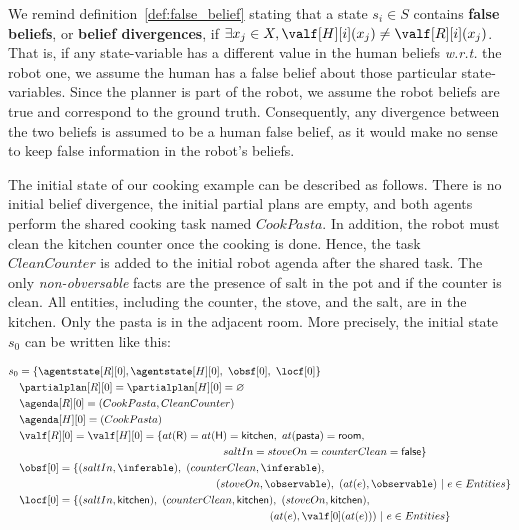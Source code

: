 We remind definition~\ref{def:false_belief} stating that a state $s_i \in S$ contains \textbf{false beliefs}, or \textbf{belief divergences}, if $\exists x_j \in X, \valf[H][i](x_j) \neq \valf[R][i](x_j)$. That is, if any state-variable has a different value in the human beliefs \textit{w.r.t.} the robot one, we assume the human has a false belief about those particular state-variables. Since the planner is part of the robot, we assume the robot beliefs are true and correspond to the ground truth. Consequently, any divergence between the two beliefs is assumed to be a human false belief, as it would make no sense to keep false information in the robot's beliefs. 

The initial state of our cooking example can be described as follows. There is no initial belief divergence, the initial partial plans are empty, and both agents perform the shared cooking task named $CookPasta$. In addition, the robot must clean the kitchen counter once the cooking is done. Hence, the task $CleanCounter$ is added to the initial robot agenda after the shared task. The only \textit{non-obversable} facts are the presence of salt in the pot and if the counter is clean. All entities, including the counter, the stove, and the salt, are in the kitchen. Only the pasta is in the adjacent room. More precisely, the initial state $s_0$ can be written like this: 


{\small
\noindent
\begin{align*}
&s_0 = \{\agentstate[R][0], \agentstate[H][0],~\obsf[0],~\locf[0]\} \\
&\quad \partialplan[R][0] = \partialplan[H][0] = \varnothing \\
&\quad \agenda[R][0] = (CookPasta, CleanCounter)\\
&\quad \agenda[H][0] = (CookPasta)\\
&\quad \valf[R][0] = \valf[H][0] = \{at(\textsf{R}) = at(\textsf{H}) = \textsf{kitchen},~at(\textsf{pasta})=\textsf{room},\\
&\qquad \qquad \qquad \qquad \qquad \qquad \qquad \qquad \qquad \quad \quad saltIn = stoveOn =counterClean = \textsf{false}\}\\
&\quad \obsf[0] = \{ (saltIn,\inferable),~(counterClean,\inferable),\\
&\qquad \qquad \qquad \qquad \qquad \qquad \qquad \qquad \qquad \quad \ (stoveOn,\observable),~(at(e),\observable) ~|~ e \in Entities\}\\
&\quad \locf[0] = \{ (saltIn,\textsf{kitchen}),~(counterClean,\textsf{kitchen}),~(stoveOn,\textsf{kitchen}),\\
&\qquad \qquad \qquad \qquad \qquad \qquad \qquad \qquad \qquad \qquad \qquad \qquad \ (at(e),\valf[0](at(e))) ~|~ e \in Entities \}
\end{align*}}

